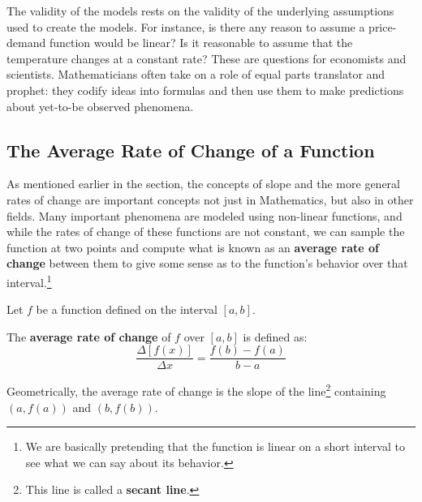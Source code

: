 \documentclass{ximera}
\begin{document}
The validity of the models rests on the validity of the underlying assumptions used to create the models.  For instance, is there any reason to assume a price-demand function would be linear?  Is it reasonable to assume that the temperature changes at a constant rate? These are questions for economists and scientists.  Mathematicians often take on a role of equal parts translator and prophet:  they codify ideas into formulas and then use them to make predictions about yet-to-be observed phenomena.  


\subsection{The Average Rate of Change of a Function}
\label{AverageRateofChange}

As mentioned earlier in the section, the concepts of slope and the more general rates of change are important concepts not just in Mathematics, but also in other fields.   Many important phenomena are modeled using non-linear functions, and while the rates of change of these functions are not constant, we can sample the function at two points and compute what is known as an \textbf{average rate of change} between them to give some sense as to the function's behavior over that interval.\footnote{We are basically pretending that the function is linear on a short interval to see what we can say about its behavior.}




\begin{definition} \label{arc}  Let $f$ be a function defined on the interval $[a,b]$. 

\smallskip

 The \textbf{average rate of change}  of $f$ over $[a,b]$ is defined as: \[ \dfrac{\Delta [f(x)]}{\Delta x} = \dfrac{f(b) - f(a)}{b-a} \]

Geometrically, the average rate of change is the slope of the line\footnote{This line is called a \textbf{secant line}.}  containing $(a, f(a))$ and $(b, f(b))$.

\end{definition}

\end{document}

